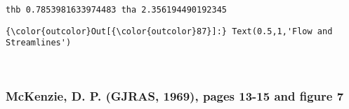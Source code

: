 \documentclass[11pt]{article}
\begin{document}
    \begin{Verbatim}[commandchars=\\\{\}]
thb 0.7853981633974483 tha 2.356194490192345

    \end{Verbatim}

\begin{Verbatim}[commandchars=\\\{\}]
{\color{outcolor}Out[{\color{outcolor}87}]:} Text(0.5,1,'Flow and Streamlines')
\end{Verbatim}
            
    \begin{center}
    \end{center}
    { \hspace*{\fill} \\}
    
    
    \hypertarget{mckenzie-d.-p.-gjras-1969-pages-13-15-and-figure-7}{%
\subsubsection{McKenzie, D. P. (GJRAS, 1969), pages 13-15 and figure
7}\label{mckenzie-d.-p.-gjras-1969-pages-13-15-and-figure-7}}

 \begin{center}
    \end{center}
   { \hspace*{\fill} \\}
    \begin{center}
    \end{center}
   { \hspace*{\fill} \\}
    \begin{center}
    \end{center}
   { \hspace*{\fill} \\}
    \begin{center}
    \end{center}
   { \hspace*{\fill} \\}





    
    
    
\end{document}
